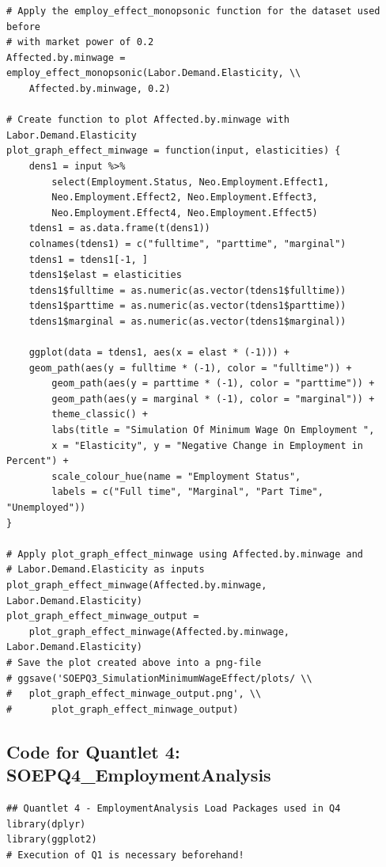 \documentclass[a4paper]{article}
\begin{document}
{\begin{lstlisting}
# Apply the employ_effect_monopsonic function for the dataset used before 
# with market power of 0.2
Affected.by.minwage = employ_effect_monopsonic(Labor.Demand.Elasticity, \\ 
	Affected.by.minwage, 0.2)

# Create function to plot Affected.by.minwage with Labor.Demand.Elasticity
plot_graph_effect_minwage = function(input, elasticities) {
    dens1 = input %>% 
    	select(Employment.Status, Neo.Employment.Effect1, 
        Neo.Employment.Effect2, Neo.Employment.Effect3, 
        Neo.Employment.Effect4, Neo.Employment.Effect5)
    tdens1 = as.data.frame(t(dens1))
    colnames(tdens1) = c("fulltime", "parttime", "marginal")
    tdens1 = tdens1[-1, ]
    tdens1$elast = elasticities
    tdens1$fulltime = as.numeric(as.vector(tdens1$fulltime))
    tdens1$parttime = as.numeric(as.vector(tdens1$parttime))
    tdens1$marginal = as.numeric(as.vector(tdens1$marginal))
    
    ggplot(data = tdens1, aes(x = elast * (-1))) + 
    geom_path(aes(y = fulltime * (-1), color = "fulltime")) + 
        geom_path(aes(y = parttime * (-1), color = "parttime")) + 
        geom_path(aes(y = marginal * (-1), color = "marginal")) + 
        theme_classic() + 
        labs(title = "Simulation Of Minimum Wage On Employment ", 
        x = "Elasticity", y = "Negative Change in Employment in Percent") + 
        scale_colour_hue(name = "Employment Status", 
        labels = c("Full time", "Marginal", "Part Time", "Unemployed"))
}

# Apply plot_graph_effect_minwage using Affected.by.minwage and 
# Labor.Demand.Elasticity as inputs
plot_graph_effect_minwage(Affected.by.minwage, Labor.Demand.Elasticity)
plot_graph_effect_minwage_output = 
    plot_graph_effect_minwage(Affected.by.minwage, Labor.Demand.Elasticity)
# Save the plot created above into a png-file 
# ggsave('SOEPQ3_SimulationMinimumWageEffect/plots/ \\ 
#	plot_graph_effect_minwage_output.png', \\
#   	plot_graph_effect_minwage_output)
\end{lstlisting}

\subsection{Code for Quantlet 4: SOEPQ4\_EmploymentAnalysis}
\begin{lstlisting}
## Quantlet 4 - EmploymentAnalysis Load Packages used in Q4
library(dplyr)
library(ggplot2)
# Execution of Q1 is necessary beforehand!


\end{lstlisting}}
\end{document}
